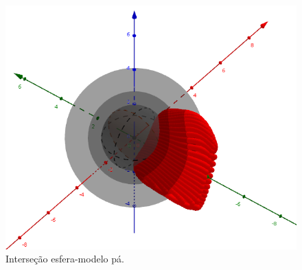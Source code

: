 \begin{figure}[t!]
	\centering
	\includegraphics[width=\columnwidth]{figs/planejamento/intersecao_geogebra.png}
	\caption{Interseção esfera-modelo pá.}
	\label{fig::intergeo}
\end{figure}
